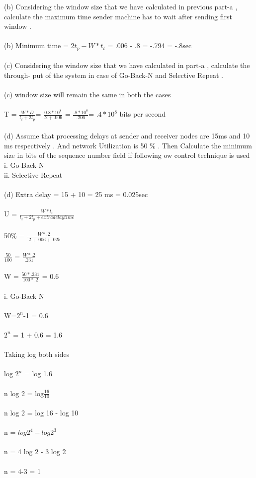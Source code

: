 \documentclass[a4paper,12pt]{article}
\begin{document}
(b) Considering the window size that we have calculated in previous part-a , calculate
the maximum time sender machine has to wait after sending first window .\\\\
(b) Minimum time = $2t_{p}- W*t_{t}$ = .006 - .8 = -.794 = -.8sec\\\\
(c) Considering the window size that we have calculated in part-a , calculate the through-
put of the system in case of Go-Back-N and Selective Repeat .\\\\
(c) window size will remain the same in both the cases\\\\
    T = $\frac{W*D}{t_{t}+2t_{p}}$= $\frac{0.8* 10^8 }{.2 +.006}$ = $\frac{.8 * 10^8}{.206}$= $.4*10^8$ bits per second\\\\
(d) Assume that processing delays at sender and receiver nodes are 15ms and 10 ms
respectively . And network Utilization is 50 \% . Then Calculate the minimum size
in bits of the sequence number field if following
ow control technique is used\\
i. Go-Back-N\\
ii. Selective Repeat\\\\
(d) Extra delay = 15 + 10 = 25 ms = 0.025sec\\\\
U = $\frac{W* t_{t}}{t_{t}+2t_{p}+ extra delay time}$ \\\\
  50\% =  $\frac{W* .2}{.2 + .006 + .025}$\\\\
  $\frac{50}{100}$ = $\frac{W*.2}{.231}$\\\\
  W = $\frac{50*.231}{100*.2}$ = 0.6\\\\
  i. Go-Back N\\\\
   W=$2^{n}$-1 = 0.6\\\\
   $2^{n}$ = 1 + 0.6 = 1.6\\\\
   Taking log both sides \\\\
   log $2^{n}$ = log 1.6\\\\
   n log 2 = log$\frac{16}{10}$\\\\
   n log 2 = log 16 - log 10 \\\\
   n = $log 2^{4} - log 2^{3}$\\\\
   n = 4 log 2 - 3 log 2 \\\\
   n = 4-3 = 1 \\\\
\end{document}
